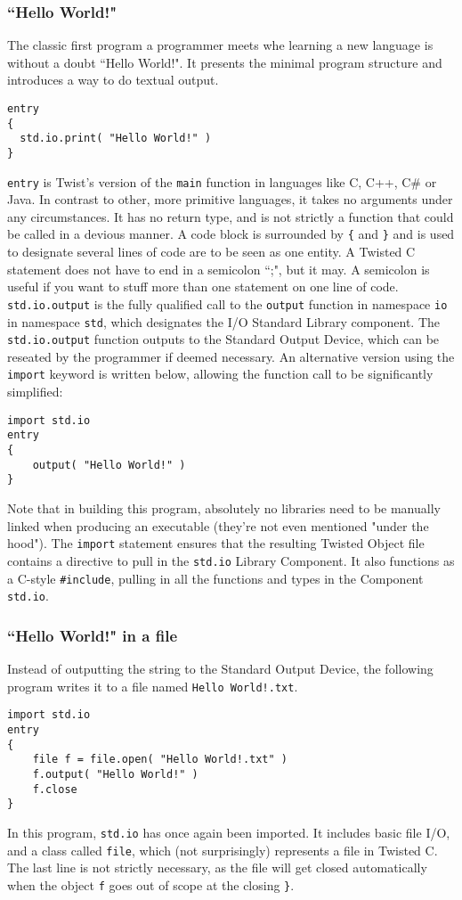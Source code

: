 \documentclass[a4paper,11pt]{report}
\newcommand{\tcode}[1]{\texttt{#1}}
\begin{document}
    \subsubsection{``Hello World!"}

The classic first program a programmer meets whe learning a new language is without a doubt ``Hello World!".
It presents the minimal program structure and introduces a way to do textual output.
\begin{lstlisting}
entry
{
  std.io.print( "Hello World!" )
}
\end{lstlisting}
\lstinline|entry| is Twist's version of the \lstinline|main| function in languages like C, C++, C\# or Java.
In contrast to other, more primitive languages, it takes no arguments under any circumstances.
It has no return type, and is not strictly a function that could be called in a devious manner.
A code block is surrounded by \tcode{\{} and \tcode{\}} and is used to designate several lines of code are to be seen as one entity.
A Twisted C statement does not have to end in a semicolon ``;", but it may.
A semicolon is useful if you want to stuff more than one statement on one line of code.
\tcode{std.io.output} is the fully qualified call to the \tcode{output} function in namespace \tcode{io} in namespace \tcode{std}, which designates the I/O Standard Library component.
The \tcode{std.io.output} function outputs to the Standard Output Device, which can be reseated by the programmer if deemed necessary.
An alternative version using the \tcode{import} keyword is written below, allowing the function call to be significantly simplified:
\begin{lstlisting}
import std.io
entry
{
    output( "Hello World!" )
}
\end{lstlisting}
Note that in building this program, absolutely no libraries need to be manually linked when producing an executable (they're not even mentioned "under the hood").
The \tcode{import} statement ensures that the resulting Twisted Object file contains a directive to pull in the \tcode{std.io} Library Component.
It also functions as a C-style \tcode{\#include}, pulling in all the functions and types in the Component \tcode{std.io}.

    \subsubsection{``Hello World!" in a file}

Instead of outputting the string to the Standard Output Device, the following program writes it to a file named \tcode{Hello World!.txt}.
\begin{lstlisting}
import std.io
entry
{
    file f = file.open( "Hello World!.txt" )
    f.output( "Hello World!" )
    f.close
}
\end{lstlisting}
In this program, \tcode{std.io} has once again been imported.
It includes basic file I/O, and a class called \tcode{file}, which (not surprisingly) represents a file in Twisted C.
The last line is not strictly necessary, as the file will get closed automatically when the object \tcode{f} goes out of scope at the closing \tcode{\}}.
\end{document}
